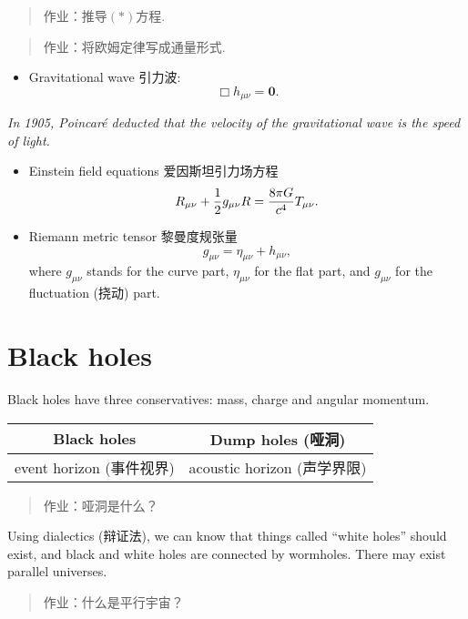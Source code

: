\begin{quote}
作业：推导\((*)\)方程.
\end{quote}

\begin{quote}
作业：将欧姆定律写成通量形式.
\end{quote}

\begin{itemize}
\tightlist{}
\item
  Gravitational wave 引力波: \[\Box h_{\mu\nu} = \mathbf{0}.\]
\end{itemize}

\emph{In 1905, Poincaré deducted that the velocity of the gravitational wave is the speed of light.}

\begin{itemize}
\tightlist{}
\item
  Einstein field equations 爱因斯坦引力场方程
  \[R_{\mu\nu}+ {1 \over 2} g_{\mu\nu}R = {8 \pi G \over c^4} T_{\mu\nu}.\]
\item
  Riemann metric tensor 黎曼度规张量
  \[g_{\mu\nu} = \eta_{\mu\nu} + h_{\mu\nu},\] where \(g_{\mu\nu}\)
  stands for the curve part, \(\eta_{\mu\nu}\) for the flat part, and
  \(g_{\mu\nu}\) for the fluctuation (挠动) part.
\end{itemize}

\section{Black holes}\label{black-holes}

Black holes have three conservatives: mass, charge and angular momentum.


\begin{center}
    \begin{tabular}{|c|c|}
        \hline
        \textbf{Black holes} & \textbf{Dump holes (哑洞)} \\
        \hline
        event horizon (事件视界) & acoustic horizon (声学界限) \\
        \hline
    \end{tabular}
\end{center}

\begin{quote}
作业：哑洞是什么？
\end{quote}

Using dialectics (辩证法), we can know that things called ``white
holes'' should exist, and black and white holes are connected by
wormholes. There may exist parallel universes.

\begin{quote}
作业：什么是平行宇宙？
\end{quote}
